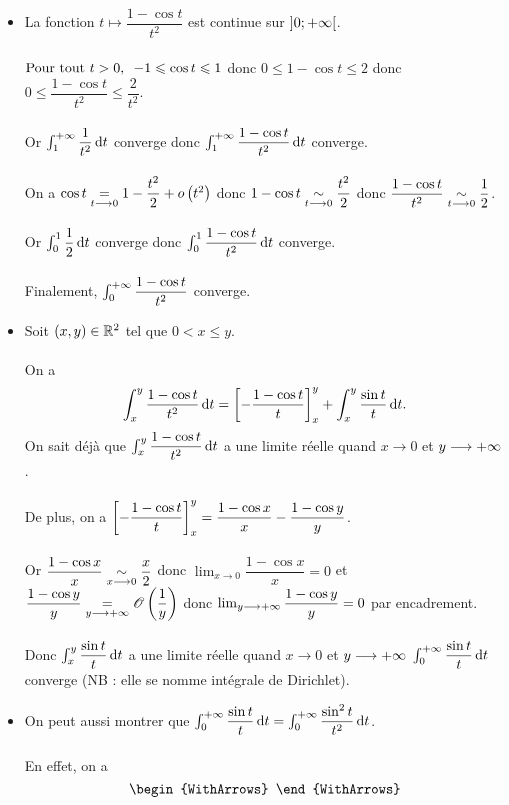 \begin{corr}
\begin{itemize}
    \item La fonction \(t\mapsto\dfrac{1-\cos t}{t^2}\) est continue sur \(\left]0;+\infty\right[\). \\\\ \(\quantifs{\Tpt t>0}-1\leq\cos t\leq1\) donc \(0\leq1-\cos t\leq2\) donc \(0\leq\dfrac{1-\cos t}{t^2}\leq\dfrac{2}{t^2}\). \\\\ Or \(\int_1^{\pinf}\dfrac{1}{t^2}\odif{t}\) converge donc \(\int_1^{\pinf}\dfrac{1-\cos t}{t^2}\odif{t}\) converge. \\\\ On a \(\cos t\underset{t\longrightarrow0}{=}1-\dfrac{t^2}{2}+o\left(t^2\right)\) donc \(1-\cos t\underset{t\longrightarrow0}{\sim}\dfrac{t^2}{2}\) donc \(\dfrac{1-\cos t}{t^2}\underset{t\longrightarrow0}{\sim}\dfrac{1}{2}\). \\\\ Or \(\int_0^1\dfrac{1}{2}\odif{t}\) converge donc \(\int_0^1\dfrac{1-\cos t}{t^2}\odif{t}\) converge. \\\\ Finalement, \(\int_0^{+\infty}\dfrac{1-\cos t}{t^2}\) converge. \\
    \item Soit \(\left(x,y\right)\in\mathbb{R}^2\) tel que \(0<x\leq y\). \\\\ On a \[\int_x^y\dfrac{1-\cos t}{t^2}\odif{t}=\croch{-\dfrac{1-\cos t}{t}}_x^y+\int_x^y\dfrac{\sin t}{t}\odif{t}.\] On sait déjà que \(\int_x^y\dfrac{1-\cos t}{t^2}\odif{t}\) a une limite réelle quand \(x\to0\) et \(y\longrightarrow+\infty\). \\\\ De plus, on a \(\left[-\dfrac{1-\cos t}{t}\right]_x^y=\dfrac{1-\cos x}{x}-\dfrac{1-\cos y}{y}\). \\\\ Or \(\dfrac{1-\cos x}{x}\underset{x\longrightarrow0}{\sim}\dfrac{x}{2}\) donc \(\lim_{x\to0}\dfrac{1-\cos x}{x}=0\) et \(\dfrac{1-\cos y}{y}\underset{y\longrightarrow+\infty}{=}\mathscr{O}\left(\dfrac{1}{y}\right)\) donc \(\lim_{y\longrightarrow+\infty}\dfrac{1-\cos y}{y}=0\) par encadrement. \\\\ Donc \(\int_x^y\dfrac{\sin t}{t}\odif{t}\) a une limite réelle quand \(x\to0\) et \(y\longrightarrow+\infty\) \ie \(\int_0^{\pinf}\dfrac{\sin t}{t}\odif{t}\) converge (NB : elle se nomme intégrale de Dirichlet). \\
    \item On peut aussi montrer que \(\int_0^{\pinf}\dfrac{\sin t}{t}\odif{t}=\int_0^{\pinf}\dfrac{\sin^2t}{t^2}\odif{t}\). \\\\ En effet, on a \[\begin{WithArrows}

\end{WithArrows}\]
\end{itemize}
\end{corr}
